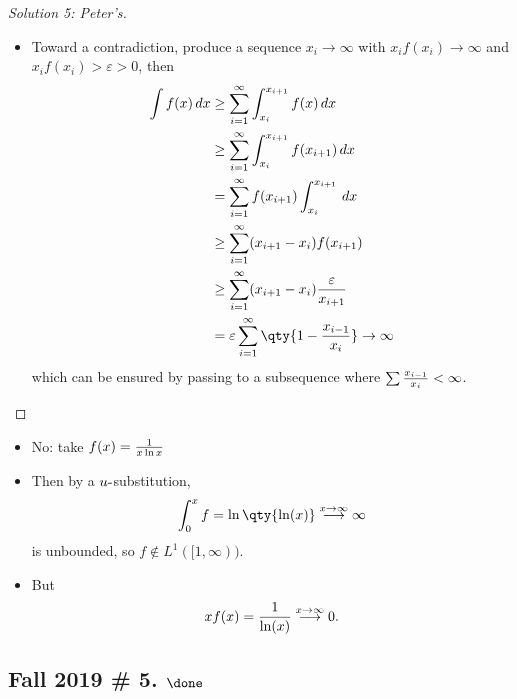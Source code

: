 \begin{solution}[of b]
\begin{proof}[Solution 5: Peter's]
\begin{itemize}
\tightlist
\item
  Toward a contradiction, produce a sequence \(x_i\to\infty\) with
  \(x_i f(x_i) \to \infty\) and \(x_if(x_i) > {\varepsilon}> 0\), then
  \begin{align*}
  \int f(x) \, dx 
  &\geq \sum_{i=1}^\infty \int_{x_i}^{x_{i+1}} f(x) \, dx \\
  &\geq \sum_{i=1}^\infty \int_{x_i}^{x_{i+1}} f(x_{i+1}) \, dx \\
  &=    \sum_{i=1}^\infty f(x_{i+1}) \int_{x_i}^{x_{i+1}} \, dx \\
  &\geq \sum_{i=1}^\infty (x_{i+1} - x_i) f(x_{i+1}) \\
  &\geq \sum_{i=1}^\infty (x_{i+1} - x_i) {{\varepsilon}\over x_{i+1}} \\
  &= {\varepsilon}\sum_{i=1}^\infty \qty{ 1 - {x_{i-1} \over x_i}} \to \infty
  \end{align*}
  which can be ensured by passing to a subsequence where
  \(\sum {x_{i-1} \over x_i} < \infty\).
\end{itemize}

\end{proof}

\end{solution}

\begin{solution}[of c]

\envlist

\begin{itemize}
\tightlist
\item
  No: take \(f(x) = {1\over x\ln x}\)
\item
  Then by a \(u{\hbox{-}}\)substitution,
  \begin{align*}
  \int_0^x f = \ln\qty{\ln (x)} \overset{x\to\infty}\longrightarrow\infty
  \end{align*}
  is unbounded, so \(f\not\in L^1([1, \infty))\).
\item
  But
  \begin{align*}
  xf(x) = { 1 \over \ln(x)} \overset{x\to\infty} \longrightarrow 0
  .\end{align*}
\end{itemize}

\end{solution}

\hypertarget{fall-2019-5.-done}{%
\subsection{\texorpdfstring{Fall 2019 \# 5.
\(\done\)}{Fall 2019 \# 5. \textbackslash done}}\label{fall-2019-5.-done}}

